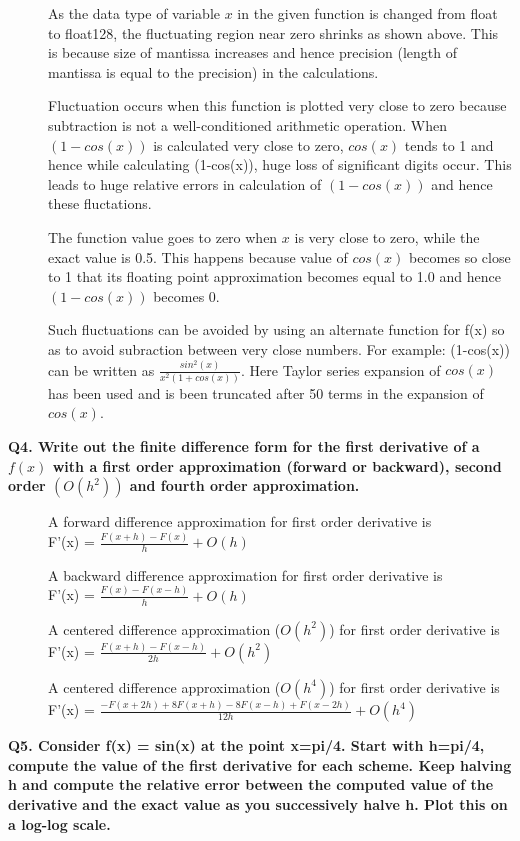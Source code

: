 \documentclass{article}
\begin{document}
\begin{description}
\item[]As the data type of variable $x$ in the given function is changed from float to float128, the fluctuating region near zero shrinks as shown above. This is because size of mantissa increases and hence precision (length of mantissa is equal to the precision) in the calculations.
\item[]Fluctuation occurs when this function is plotted very close to zero because subtraction is not a well-conditioned arithmetic operation. When $(1-cos(x))$ is calculated very close to zero, $cos(x)$ tends to 1 and hence while calculating (1-cos(x)), huge loss of significant digits occur. This leads to huge relative errors in calculation of $(1-cos(x))$ and hence these fluctations.
\item[]The function value goes to zero when $x$ is very close to zero, while the exact value is 0.5. This happens because value of $cos(x)$ becomes so close to 1 that its floating point approximation becomes equal to 1.0 and hence $(1-cos(x))$ becomes 0.
\item[]Such fluctuations can be avoided by using an alternate function for f(x) so as to avoid subraction between very close numbers. For example: (1-cos(x)) can be written as $\frac{sin^2(x)}{x^2(1+cos(x))}$. Here Taylor series expansion of $cos(x)$ has been used and is been truncated after 50 terms in the expansion of $cos(x)$.
\end{description}

\textbf{Q4. Write out the finite difference form for the first derivative of a $f(x)$ with a first order approximation (forward or backward), second order $(O(h^2))$ and fourth order approximation.}
\begin{description}
\item[] A forward difference approximation for first order derivative is
\\F'(x) = $\frac{F(x + h) − F(x)}{h}+ O(h)$
\item[]A backward difference approximation for first order derivative is
\\F'(x) = $\frac{F(x) − F(x-h)}{h}+ O(h)$
\item[]A centered difference approximation ($ O(h^2)$) for first order derivative is
\\F'(x) = $\frac{F(x + h) − F(x-h)}{2h}+ O(h^2)$
\item[]A centered difference approximation ($ O(h^4)$) for first order derivative is
\\F'(x) = $\frac{−F(x + 2h) + 8F(x + h) − 8F(x − h) + F(x − 2h)}{12h}+ O(h^4)$
\end{description}
\textbf{Q5. Consider f(x) = sin(x) at the point x=pi/4.  Start with h=pi/4, compute the value of the first derivative for each scheme.  Keep halving h and compute the relative error between the computed value of the derivative and the exact value as you successively halve h.  Plot this on a log-log scale.}
\end{document}
